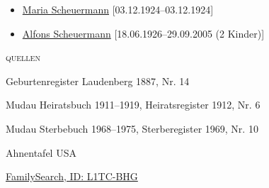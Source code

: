 \begin{person}[
    surname = {Zimmermann},
    givenname = {Anna},
    suffix = {1887--1969},
    label = {@I14@},
    filename = {Anna Zimmermann (1887)}
    ]
\begin{itemize}
\item \hyperref[@I1208@]{Maria Scheuermann} [03.12.1924--03.12.1924]
\item \hyperref[@I75@]{Alfons Scheuermann} [18.06.1926--29.09.2005 (2 Kinder)]
\end{itemize}
\medbreak
\textsc{{quellen}}
\begin{enumerate}[label={[\arabic*]}]
\item Geburtenregister Laudenberg 1887, Nr. 14
\item Mudau Heiratsbuch 1911–1919, Heiratsregister 1912, Nr. 6
\item Mudau Sterbebuch 1968–1975, Sterberegister 1969, Nr. 10
\item Ahnentafel USA
\item \href{https://www.familysearch.org/tree/person/details/L1TC-BHG}{FamilySearch, ID: L1TC-BHG}
\end{enumerate}

\end{person}


